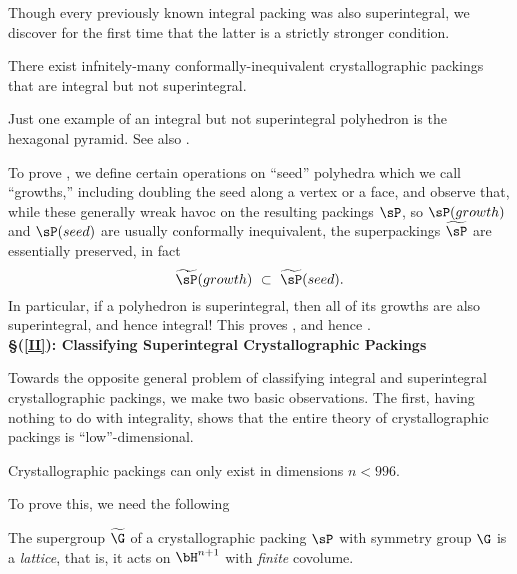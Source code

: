 \documentclass[12pt,reqno]{amsart}
\begin{document}
Though 
every previously known integral packing was also superintegral, 
we discover for the first time that the latter is a strictly stronger condition.

\begin{lem}
There exist infnitely-many conformally-inequivalent crystallographic packings that are integral but not superintegral.
\end{lem}

\begin{rmk}\label{rmk:hexPyr}
Just one example of an integral but not superintegral 
polyhedron is
the hexagonal pyramid. See also .
\end{rmk}

To prove , we define certain %
operations on ``seed'' polyhedra which we call ``growths,''  including doubling 
the seed
along a vertex or a face, and observe that, while these generally wreak havoc on the resulting packings $\sP$, so $\sP(growth)$ and $\sP(seed)$ are usually  conformally inequivalent, 
 the superpackings $\widetilde\sP$ are essentially preserved, in fact
 $$ 
 \widetilde\sP(growth) \ \subset \ \widetilde\sP(seed).
 $$
 In particular, if a polyhedron is superintegral, then all of its growths are also superintegral, and hence integral! 
 This proves , and hence 
.
\\



\noindent
{\bf \S(\ref{II}): Classifying Superintegral Crystallographic Packings}\

Towards the opposite general problem of classifying integral and superintegral crystallographic packings, we make
 two basic observations. The first, having nothing to do with integrality, shows that the entire theory of crystallographic packings is ``low''-dimensional.

\begin{thm}\label{thm:finDim}
Crystallographic packings can only exist in dimensions $n<996$.
\end{thm}

To prove this, we need the following
\begin{lem}\label{lem:lattice}
The supergroup $\widetilde\G$ of a crystallographic packing $\sP$ with symmetry group $\G$ is %
a {\em lattice}, that is, it acts on $\bH^{n+1}$ with {\it finite} covolume.
\end{lem}
\end{document}
